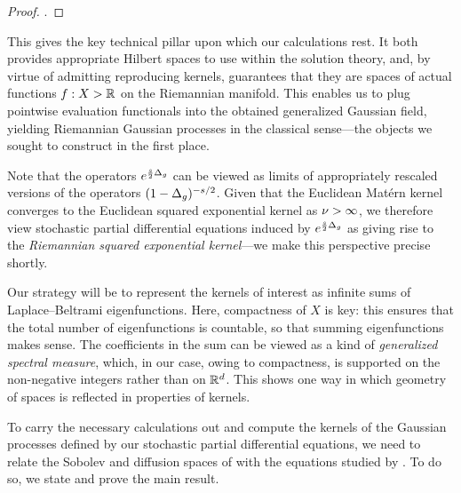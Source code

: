 \documentclass[11pt]{book}
\begin{document}
\begin{proof}
\textcite[Theorem 3 and Theorem 6]{devito20}.
\end{proof}

This gives the key technical pillar upon which our calculations rest.
It both provides appropriate Hilbert spaces to use within the solution theory, and, by virtue of admitting reproducing kernels, guarantees that they are spaces of actual functions $f : X \-> \mathbb{R}$ on the Riemannian manifold.
This enables us to plug pointwise evaluation functionals into the obtained generalized Gaussian field, yielding Riemannian Gaussian processes in the classical sense---the objects we sought to construct in the first place.

Note that the operators $e^{\frac{s}{2}\Delta_g}$ can be viewed as limits of appropriately rescaled versions of the operators $(1 - \Delta_g)^{-s/2}$. 
Given that the Euclidean Matérn kernel converges to the Euclidean squared exponential kernel as $\nu\->\infty$, we therefore view stochastic partial differential equations induced by $e^{\frac{s}{2}\Delta_g}$ as giving rise to the \emph{Riemannian squared exponential kernel}---we make this perspective precise shortly.

Our strategy will be to represent the kernels of interest as infinite sums of Laplace--Beltrami eigenfunctions.
Here, compactness of $X$ is key: this ensures that the total number of eigenfunctions is countable, so that summing eigenfunctions makes sense.
The coefficients in the sum can be viewed as a kind of \emph{generalized spectral measure}, which, in our case, owing to compactness, is supported on the non-negative integers rather than on $\mathbb{R}^d$.
This shows one way in which geometry of spaces is reflected in properties of kernels.

To carry the necessary calculations out and compute the kernels of the Gaussian processes defined by our stochastic partial differential equations, we need to relate the Sobolev and diffusion spaces of \textcite{devito20} with the equations studied by \textcite{whittle54,whittle63,lindgren11}.
To do so, we state and prove the main result.
\end{document}
